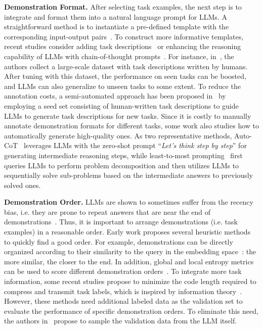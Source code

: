 {{{{{{\textbf{Demonstration Format.} After selecting task examples, the next step is to integrate and format them into a natural language prompt for LLMs. A straightforward method is to instantiate a pre-defined template with the corresponding input-output pairs~\cite{Liu-survey-2023-Pre-train}. To construct more informative templates, recent studies consider adding task descriptions~\cite{Chung-arxiv-2022-Scaling} or enhancing the reasoning capability of LLMs with chain-of-thought prompts~\cite{Wei-arxiv-2022-chain}. For instance, in~\cite{Mishra-ACL-2022-Cross}, the authors collect a large-scale dataset with task descriptions written by humans. After tuning with this dataset, the performance on seen tasks can be boosted, and LLMs can also generalize to unseen tasks to some extent. To reduce the annotation costs, a semi-automated approach has been proposed in~\cite{Wang-arXiv-2022-Self} by employing a seed set consisting of human-written task descriptions to guide LLMs to generate task descriptions for new tasks. Since it is costly to manually annotate demonstration formats for different tasks, some work also studies how to automatically generate high-quality ones. As two representative methods, Auto-CoT~\cite{Zhang-arxiv-2022-Automatic} leverages LLMs with the zero-shot prompt ``\emph{Let’s think step by step}'' for generating intermediate reasoning steps, while least-to-most prompting~\cite{Zhou-arxiv-2022-Least} first queries LLMs to perform problem decomposition and then utilizes LLMs to sequentially solve sub-problems based on the intermediate answers to previously solved ones.  

\textbf{Demonstration Order.} LLMs are shown to sometimes suffer from the {recency} bias, i.e. they are prone to repeat answers that are near the end of demonstrations~\cite{Zhao-ICML-2021-Calibrate}. Thus, it is important to arrange demonstrations (i.e. task examples) in a reasonable order. Early work proposes several heuristic methods to quickly find a good order. For example, demonstrations can be directly organized according to their similarity to the query in the embedding space~\cite{Liu-ACL-2022-What}: the more similar, the closer to the end. In addition, global and local entropy metrics can be used to score different demonstration orders~\cite{Lu-ACL-2022-Fantasically}. To integrate more task information, some recent studies propose to minimize the {code length} required to compress and transmit task labels, which is inspired by information theory~\cite{Wu-arxiv-2022-Self}. However, these methods need additional labeled data as the {validation set to evaluate the performance of specific demonstration orders}. To eliminate this need, the authors in~\cite{Lu-ACL-2022-Fantasically} propose to sample the validation data from the LLM itself. 

}}}}}}
